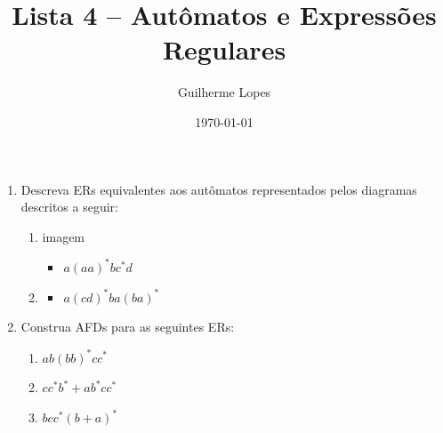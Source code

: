 \documentclass[12pt]{article}
\title{Lista 4 -- Autômatos e Expressões Regulares}
\author{Guilherme Lopes}
\date{\today}
\begin{document}
\maketitle


\begin{enumerate}
    \item Descreva ERs equivalentes aos autômatos representados pelos diagramas 
    descritos a seguir:
    \begin{enumerate}[label=\alph*.]
        \item imagem
        \begin{itemize}[label=R:]
            \item $a(aa)^*bc^*d$
        \end{itemize}
        \item 
        \begin{itemize}[label=R:]
            \item $a(cd)^*ba(ba)^*$
        \end{itemize}
    \end{enumerate}
    \item Construa AFDs para as seguintes ERs:
    \begin{enumerate}[label=\alph*.]
        \item $ab(bb)^*cc^*$
        \item $cc^*b^*+ab^*cc^*$
        \item $bcc^*(b+a)^*$
    \end{enumerate}
\end{enumerate}
\end{document}
